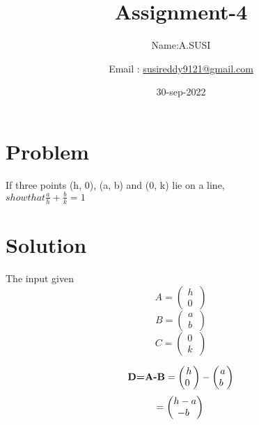\documentclass[10pt, a4paper]{article}
\begin{document}
\title{Assignment-4}
\author{Name:A.SUSI\and Email :  \url{susireddy9121@gmail.com}}
\date{30-sep-2022}
\maketitle



\section{Problem}
If three points (h, 0), (a, b) and (0, k) lie on a line, \\
$show that \frac{a}{h}+\frac{b}{k}=1$\\
\section{Solution}
\begin{center}
The input given 
\boldmath
\begin{equation} \label{eq:}
A=\begin{pmatrix} h\\ 0\ \end{pmatrix} 
\end{equation}
\begin{equation}\label{eq:}
B=\begin{pmatrix} a\\ b\ \end{pmatrix}
\end{equation}
\begin{equation}\label{eq:}
C=\begin{pmatrix} 0\\ k\ \end{pmatrix}
\end{equation}
\unboldmath
\end{center}
\begin{equation}\label{eq:}
\textbf{D=A-B}\\
=\begin{pmatrix} h\\ 0\ \end{pmatrix}- \begin{pmatrix} a\\ b\ \end{pmatrix}
\end{equation}
\begin{equation}\label{eq:}
=\begin{pmatrix} h-a\\ -b\ \end{pmatrix}\\
\end{equation}
\end{document}
